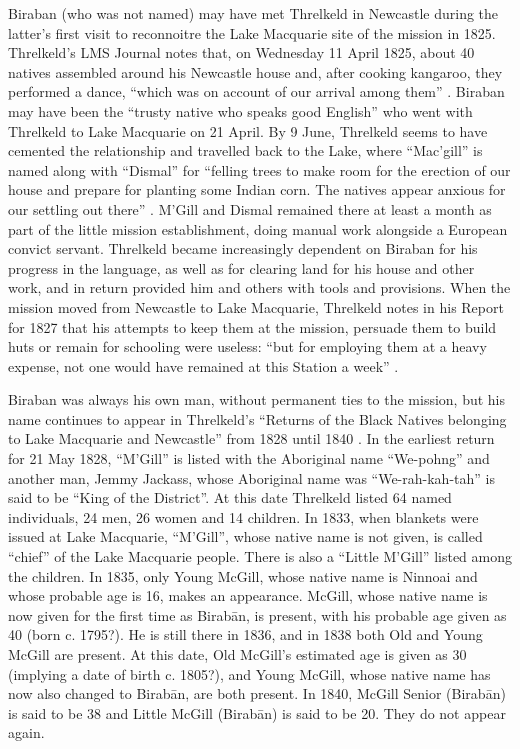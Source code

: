 Biraban (who was not named) may have met Threlkeld in Newcastle during the latter’s first visit to reconnoitre the Lake Macquarie site of the mission in 1825. Threlkeld’s LMS Journal notes that, on Wednesday 11 April 1825, about 40 natives assembled around his Newcastle house and, after cooking kangaroo, they performed a dance, “which was on account of our arrival among them” \citep[fol. 4]{threlkeld_journal_1824}. Biraban may have been the “trusty native who speaks good English” who went with Threlkeld to Lake Macquarie on 21 April. By 9 June, Threlkeld seems to have cemented the relationship and travelled back to the Lake, where “Mac’gill” is named along with “Dismal” for “felling trees to make room for the erection of our house and prepare for planting some Indian corn. The natives appear anxious for our settling out there” \citep[fol. 5]{threlkeld_journal_1824}. M’Gill and Dismal remained there at least a month as part of the little mission establishment, doing manual work alongside a European convict servant. Threlkeld became increasingly dependent on Biraban for his progress in the language, as well as for clearing land for his house and other work, and in return provided him and others with tools and provisions. When the mission moved from Newcastle to Lake Macquarie, Threlkeld notes in his Report for 1827 that his attempts to keep them at the mission, persuade them to build huts or remain for schooling were useless: “but for employing them at a heavy expense, not one would have remained at this Station a week” \citep[96]{gunson_australian_1974a}.

Biraban was always his own man, without permanent ties to the mission, but his name continues to appear in Threlkeld’s “Returns of the Black Natives belonging to Lake Macquarie and Newcastle” from 1828 until 1840 \citep[360--370]{gunson_australian_1974b}. In the earliest return for 21 May 1828, “M’Gill” is listed with the Aboriginal name “We-pohng” and another man, Jemmy Jackass, whose Aboriginal name was “We-rah-kah-tah” is said to be “King of the District”. At this date Threlkeld listed 64 named individuals, 24 men, 26 women and 14 children. In 1833, when blankets were issued at Lake Macquarie, “M’Gill”, whose native name is not given, is called “chief” of the Lake Macquarie people. There is also a “Little M’Gill” listed among the children. In 1835, only Young McGill, whose native name is Ninnoai and whose probable age is 16, makes an appearance. McGill, whose native name is now given for the first time as Birabān, is present, with his probable age given as 40 (born c. 1795?). He is still there in 1836, and in 1838 both Old and Young McGill are present. At this date, Old McGill’s estimated age is given as 30 (implying a date of birth c. 1805?), and Young McGill, whose native name has now also changed to Birabān, are both present. In 1840, McGill Senior (Birabān) is said to be 38 and Little McGill (Birabān) is said to be 20. They do not appear again.

